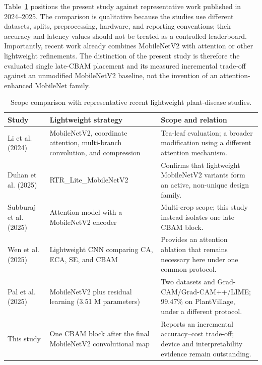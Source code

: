 Table~\ref{tab:recent_lightweight_work} positions the present study against representative work published in 2024--2025. The comparison is qualitative because the studies use different datasets, splits, preprocessing, hardware, and reporting conventions; their accuracy and latency values should not be treated as a controlled leaderboard. Importantly, recent work already combines MobileNetV2 with attention or other lightweight refinements. The distinction of the present study is therefore the evaluated single late-CBAM placement and its measured incremental trade-off against an unmodified MobileNetV2 baseline, not the invention of an attention-enhanced MobileNet family.

\begin{table}[H]
\caption{Scope comparison with representative recent lightweight plant-disease studies.}
\label{tab:recent_lightweight_work}
\centering
\small
\begin{tabularx}{\textwidth}{p{2.8cm} p{4.3cm} X}
\toprule
\textbf{Study} & \textbf{Lightweight strategy} & \textbf{Scope and relation} \\
\midrule
Li et al. (2024)~\cite{li2024tea_mobilenetv2} & MobileNetV2, coordinate attention, multi-branch convolution, and compression & Tea-leaf evaluation; a broader modification using a different attention mechanism. \\
Duhan et al. (2025)~\cite{duhan2025rtr} & RTR\_Lite\_MobileNetV2 & Confirms that lightweight MobileNetV2 variants form an active, non-unique design family. \\
Subburaj et al. (2025)~\cite{subburaj2025plantention} & Attention model with a MobileNetV2 encoder & Multi-crop scope; this study instead isolates one late CBAM block. \\
Wen et al. (2025)~\cite{wen2025mnasnet} & Lightweight CNN comparing CA, ECA, SE, and CBAM & Provides an attention ablation that remains necessary here under one common protocol. \\
Pal et al. (2025)~\cite{pal2025mobres} & MobileNetV2 plus residual learning (3.51 M parameters) & Two datasets and Grad-CAM/Grad-CAM++/LIME; 99.47\% on PlantVillage, under a different protocol. \\
This study & One CBAM block after the final MobileNetV2 convolutional map & Reports an incremental accuracy--cost trade-off; device and interpretability evidence remain outstanding. \\
\bottomrule
\end{tabularx}
\normalsize
\end{table}
